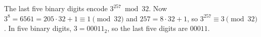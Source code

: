 The last five binary digits encode $3^{257}\bmod 32$. Now $3^8=6561=205\cdot32+1\equiv1\pmod{32}$ and $257=8\cdot32+1$, so $3^{257}\equiv3\pmod{32}$. In five binary digits, $3=00011_2$, so the last five digits are $\boxed{00011}$.
